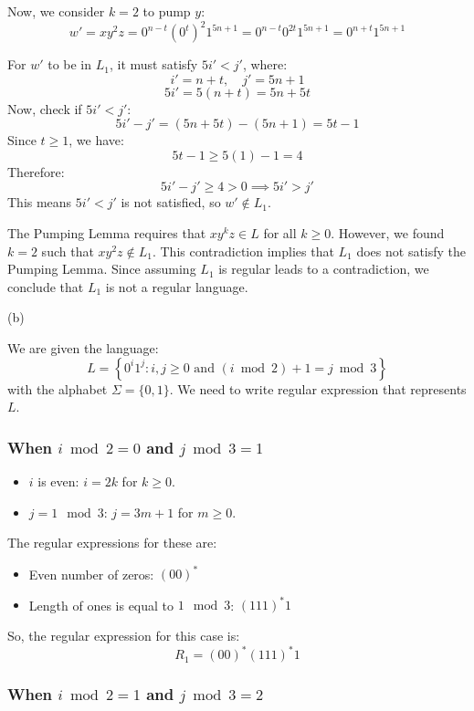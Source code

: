 \documentclass[12 pt]{article}
\begin{document}
Now, we consider \( k = 2 \) to pump \( y \):
\[
w' = xy^2z = 0^{n - t} (0^t)^2 1^{5n + 1} = 0^{n - t} 0^{2t} 1^{5n + 1} = 0^{n + t}1^{5n + 1}
\]


For \( w' \) to be in \( L_1 \), it must satisfy \( 5i' < j' \), where:
\[
i' = n + t, \quad j' = 5n + 1
\]
\[
5i' = 5(n + t) = 5n + 5t
\]
Now, check if \( 5i' < j' \):
\[
5i' - j' = (5n + 5t) - (5n + 1) = 5t - 1
\]
Since \( t \geq 1 \), we have:
\[
5t - 1 \geq 5(1) - 1 = 4
\]
Therefore:
\[
5i' - j' \geq 4 > 0 \implies 5i' > j'
\]
This means \( 5i' < j' \) is not satisfied, so \( w' \notin L_1 \).

The Pumping Lemma requires that \( xy^kz \in L \) for all \( k \geq 0 \). However, we found \( k = 2 \) such that \( xy^2z \notin L_1 \). This contradiction implies that \( L_1 \) does not satisfy the Pumping Lemma. Since assuming \( L_1 \) is regular leads to a contradiction, we conclude that \( L_1 \) is not a regular language.

\vspace{1cm}

(b)


We are given the language:
\[
L = \left\{ 0^i1^j : i, j \geq 0 \text{ and } (i \bmod 2) + 1 = j \bmod 3 \right\}
\]
with the alphabet \(\Sigma = \{0, 1\}\). We need to write regular expression that represents \(L\).

\subsubsection*{When \(i \bmod 2 = 0\) and \(j \bmod 3 = 1\)}

\begin{itemize}
    \item \(i\) is even: \(i = 2k\) for \(k \geq 0\).
    \item \(j = 1 \mod 3\): \(j = 3m + 1\) for \(m \geq 0\).
\end{itemize}

The regular expressions for these are:

\begin{itemize}
    \item Even number of zeros: \((00)^*\)
    \item Length of ones is equal to \(1 \mod 3\): \((111)^*1\)
\end{itemize}

So, the regular expression for this case is:
\[
R_1 = (00)^*(111)^*1
\]

\subsubsection*{When \(i \bmod 2 = 1\) and \(j \bmod 3 = 2\)}
\end{document}
